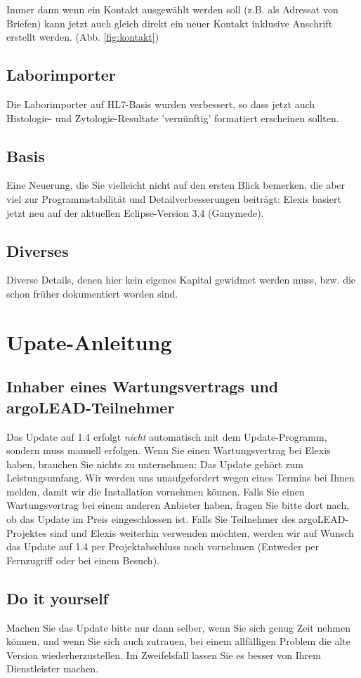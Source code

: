 \documentclass[a4paper]{scrartcl}
\begin{document}
Immer dann wenn ein Kontakt ausgewählt werden soll (z.B. als Adressat von Briefen) kann jetzt auch gleich direkt ein neuer Kontakt inklusive Anschrift erstellt werden. (Abb. \ref{fig:kontakt})

\subsection{Laborimporter}
Die Laborimporter auf HL7-Basis wurden verbessert, so dass jetzt auch Histologie- und Zytologie-Resultate 'vernünftig' formatiert erscheinen sollten.

\subsection{Basis}
Eine Neuerung, die Sie vielleicht nicht auf den ersten Blick bemerken, die aber viel zur Programmstabilität und Detailverbesserungen beiträgt: Elexis basiert jetzt neu auf der aktuellen Eclipse-Version 3.4 (Ganymede).

\subsection{Diverses}
Diverse Details, denen hier kein eigenes Kapital gewidmet werden muss, bzw. die schon früher dokumentiert worden sind.

\section{Upate-Anleitung}
\label{update}
\subsection{Inhaber eines Wartungsvertrags und argoLEAD-Teilnehmer}
Das Update auf 1.4 erfolgt \textit{nicht} automatisch mit dem Update-Programm, sondern muss manuell erfolgen. Wenn Sie einen Wartungsvertrag bei Elexis haben, brauchen Sie nichts zu unternehmen: Das Update gehört zum Leistungsumfang. Wir werden uns unaufgefordert wegen eines Termins bei Ihnen melden, damit wir die Installation vornehmen können. Falls Sie einen Wartungsvertrag bei einem anderen Anbieter haben, fragen Sie bitte dort nach, ob das Update im Preis eingeschlossen ist. Falls Sie Teilnehmer des argoLEAD-Projektes sind und Elexis weiterhin verwenden möchten, werden wir auf Wunsch das Update auf 1.4 per Projektabschluss noch vornehmen (Entweder per Fernzugriff oder bei einem Besuch).

\subsection{Do it yourself}
Machen Sie das Update bitte nur dann selber, wenn Sie sich genug Zeit nehmen können, und wenn Sie sich auch zutrauen, bei einem allfälligen Problem die alte Version wiederherzustellen. Im Zweifelsfall lassen Sie es besser von Ihrem Dienstleister machen.
\end{document}
